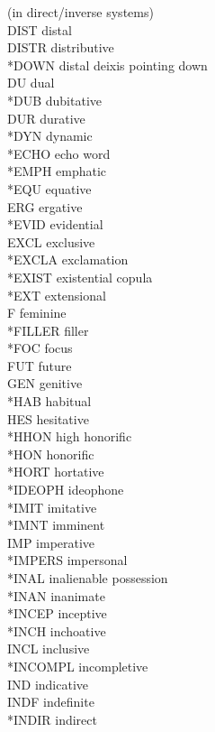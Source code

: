 \documentclass[a4paper, 11pt]{book}
\begin{document}
\begin{multicols}{2}
\begin{tabbing}
		\>(in direct/inverse systems) \\
	DIST \> distal \\
	DISTR \> distributive \\
	*DOWN \> distal deixis pointing down \\
	DU \> dual \\
	*DUB \> dubitative \\
	DUR \> durative \\
	*DYN \> dynamic \\
	*ECHO \> echo word \\
	*EMPH \> emphatic \\
	*EQU \> equative \\
	ERG \> ergative \\
	*EVID \> evidential \\
	EXCL \> exclusive \\
	*EXCLA \> exclamation \\
	*EXIST \> existential copula \\
	*EXT \> extensional \\
	F \> feminine \\
	*FILLER \> filler \\
	*FOC \> focus \\
	FUT \> future \\
	GEN \> genitive \\
	*HAB \> habitual \\
	HES \> hesitative \\
	*HHON \> high honorific \\
	*HON \> honorific \\
	*HORT \> hortative \\
	*IDEOPH \> ideophone \\
	*IMIT \> imitative \\
	*IMNT \> imminent \\
	IMP \> imperative \\
	*IMPERS \> impersonal \\
	*INAL \> inalienable possession \\
	*INAN \> inanimate \\
	*INCEP \> inceptive \\
	*INCH \> inchoative \\
	INCL \> inclusive \\
	*INCOMPL \> incompletive \\
	IND \> indicative \\
	INDF \> indefinite \\
	*INDIR \> indirect \\

\end{tabbing}
\end{multicols}
\end{document}
